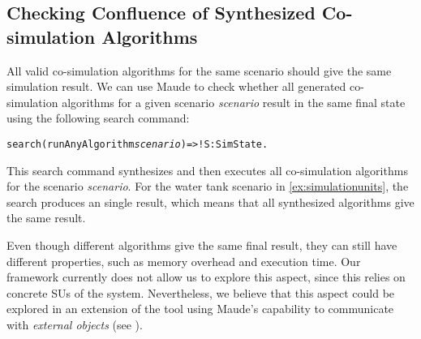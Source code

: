 \subsection{Checking Confluence of Synthesized Co-simulation Algorithms}
All valid co-simulation algorithms for the same scenario should give the same simulation result.
We can use Maude to check whether all generated co-simulation algorithms for a given scenario \emph{scenario} result in the same final state using the following search command:

\small
\begin{alltt}
  search (runAnyAlgorithm \emph{scenario})  =>! S:SimState . 
  \end{alltt}
\normalsize

This search command synthesizes and then executes all co-simulation algorithms for the scenario \emph{scenario}. 
For the water tank scenario in \cref{ex:simulationunits}, the search produces an single result, which means that all synthesized algorithms give the same result.


Even though different algorithms give the same final result, they can still have different properties, such as memory overhead and execution time. 
Our framework currently does not allow us to explore this aspect, since this relies on concrete SUs of the system.
Nevertheless, we believe that this aspect could be explored in an extension of the tool using Maude's capability to communicate with \emph{external objects} (see \cite[Section 9]{}).